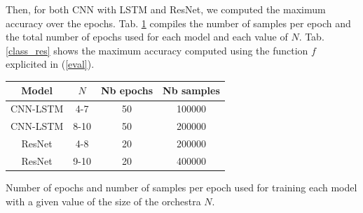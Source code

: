 \documentclass{article}
\begin{document}
Then, for both CNN with LSTM and ResNet, we computed the maximum accuracy over the epochs. Tab. \ref{epoch} compiles the number of samples per epoch and the total number of epochs used for each model and each value of $N$. Tab. \ref{class_res} shows the maximum accuracy computed using the function $f$ explicited in (\ref{eval}).



\begin{table}
\begin{tabular}{|c|c|c|c|}
\hline
Model & $N$ & Nb epochs & Nb samples\\
\hline
CNN-LSTM & 4-7 & 50 & 100000 \\
CNN-LSTM & 8-10 & 50 & 200000 \\
ResNet & 4-8 & 20 & 200000 \\
ResNet & 9-10 & 20 & 400000 \\
\hline
\end{tabular}

\begin{caption}
Number of epochs and number of samples per epoch used for training each model with a given value of the size of the orchestra $N$.
\label{epoch}
\end{caption}
\end{table}
\end{document}

